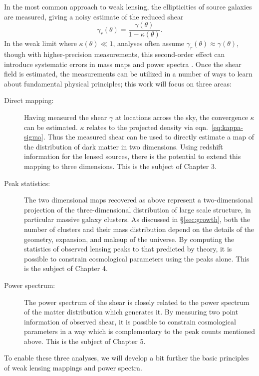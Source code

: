 In the most common approach to weak lensing,
the ellipticities of source galaxies are measured, 
giving a noisy estimate of the reduced shear
\begin{equation}
  \gamma_r(\theta) = \frac{\gamma(\theta)}{1 - \kappa(\theta)}.
\end{equation}
In the weak limit where $\kappa(\theta) \ll 1$, analyses often assume
$\gamma_r(\theta) \approx \gamma(\theta)$, though with higher-precision
measurements, this second-order effect can introduce systematic
errors in mass maps and power spectra \citep{Dodelson06, Shapiro09, Krause10}.
Once the shear field is estimated, the
measurements can be utilized in a number of ways to learn about
fundamental physical principles; this work will focus on three areas:
\begin{description}
  \item[Direct mapping:] Having measured the shear $\gamma$ at locations
    across the sky, the convergence $\kappa$ can be estimated.  $\kappa$
    relates to the projected density via eqn.~\ref{eq:kappa-sigma}.  Thus
    the measured shear can be used to directly estimate a map of the
    distribution of dark matter in two dimensions.  Using redshift
    information for the lensed sources, there is the potential to extend
    this mapping to three dimensions. This is the subject of Chapter 3.
  \item[Peak statistics:] The two dimensional maps recovered as above
    represent a two-dimensional projection of the three-dimensional
    distribution of large scale structure, in particular massive galaxy
    clusters.  As discussed in \S\ref{sec:growth}, both the number of
    clusters and their mass distribution depend on the details of the
    geometry, expansion, and makeup of the universe.  By computing the
    statistics of observed lensing peaks to 
    that predicted by theory, it is possible to
    constrain cosmological parameters using the peaks alone.  This is
    the subject of Chapter 4.
  \item[Power spectrum:] The power spectrum of the shear is closely related
    to the power spectrum of the matter distribution which generates it.
    By measuring two point information of observed shear, it is possible
    to constrain cosmological parameters in a way which is complementary
    to the peak counts mentioned above.  This is the subject of Chapter 5.
\end{description}

To enable these three analyses, we will develop a bit further the basic
principles of weak lensing mappings and power spectra.

